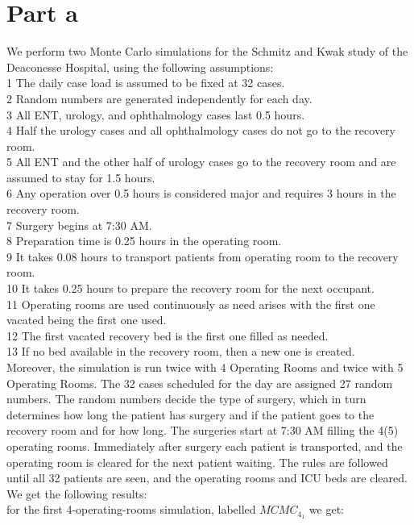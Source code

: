 \section{Part a}

We perform two Monte Carlo simulations for the Schmitz and Kwak study of the Deaconesse Hospital, using the following assumptions:\\
1 The daily case load is assumed to be fixed at 32 cases.\\
2 Random numbers are generated independently for each day.\\
3 All ENT, urology, and ophthalmology cases last 0.5 hours.\\
4 Half the urology cases and all ophthalmology cases do not go to the recovery room.\\
5 All ENT and the other half of urology cases go to the recovery room and are assumed to stay for 1.5 hours.\\
6 Any operation over 0.5 hours is considered major and requires 3 hours in the recovery room.\\
7 Surgery begins at 7:30 AM.\\
8 Preparation time is 0.25 hours in the operating room.\\
9 It takes 0.08 hours to transport patients from operating room to the recovery room.\\
10 It takes 0.25 hours to prepare the recovery room for the next occupant.\\
11 Operating rooms are used continuously as need arises with the first one vacated being the first one used.\\
12 The first vacated recovery bed is the first one filled as needed.\\
13 If no bed available in the recovery room, then a new one is created.\\

Moreover, the simulation is run twice with 4 Operating Rooms and twice with 5 Operating Rooms.
The 32 cases scheduled for the day are assigned 27 random numbers.
The random numbers decide the type of surgery, which in turn determines how long the patient has surgery and if the patient goes to the recovery room and for how long.
The surgeries start at 7:30 AM filling the 4(5) operating rooms. Immediately after surgery each patient is transported, and the operating room is cleared for the next patient waiting.
The rules are followed until all 32 patients are seen, and the operating rooms and ICU beds are cleared.\\
We get the following results:\\
for the first 4-operating-rooms simulation, labelled $MCMC_{4_{1}}$ we get:
$$
